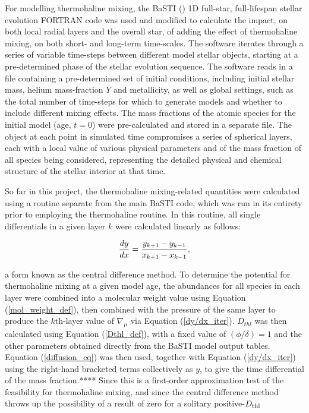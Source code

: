\documentclass[usenatbib]{mnras}
\begin{document}
For modelling thermohaline mixing, the BaSTI (\citet{2004ApJ...612..168P}) 1D full-star, full-lifespan stellar evolution FORTRAN code was used and modified to calculate the impact, on both local radial layers and the overall star, of adding the effect of thermohaline mixing, on both short- and long-term time-scales. The software iterates through a series of variable time-steps between different model stellar objects, starting at a pre-determined phase of the stellar evolution sequence. The software reads in a file containing a pre-determined set of initial conditions, including initial stellar mass, helium mass-fraction $Y$ and metallicity, as well as global settings, such as the total number of time-steps for which to generate models and whether to include different mixing effects. The mass fractions of the atomic species for the initial model (age, $t = 0$) were pre-calculated and stored in a separate file.
The object at each point in simulated time compromises a series of spherical layers, each with a local value of various physical parameters and of the mass fraction of all species being considered, representing the detailed physical and chemical structure of the stellar interior at that time.

So far in this project, the thermohaline mixing-related quantities were calculated using a routine separate from the main BaSTI code, which was run in its entirety prior to employing the thermohaline routine. In this routine, all single differentials in a given layer $k$ were calculated linearly as follows:

\begin{equation}
\frac{dy}{dx} = \frac{y_{k+1} - y_{k-1}}{x_{k+1} - x_{k-1}} \textnormal{,}
\label{dy/dx_iter}
\end{equation}

a form known as the central difference method.
To determine the potential for thermohaline mixing at a given model age, the abundances for all species in each layer were combined into a molecular weight value using Equation (\ref{mol_weight_def}), then combined with the pressure of the same layer to produce the $k$th-layer value of $\nabla_{\mu}$ via Equation (\ref{dy/dx_iter}). $D_{thl}$ was then calculated using Equation (\ref{Dthl_def}), with a fixed value of $(\phi/\delta) = 1$ and the other parameters obtained directly from the BaSTI model output tables. Equation (\ref{diffusion_eq}) was then used, together with Equation (\ref{dy/dx_iter}) using the right-hand bracketed terms collectively as $y$, to give the time differential of the mass fraction.**** Since this is a first-order approximation test of the feasibility for thermohaline mixing, and since the central difference method throws up the possibility of a result of zero for a solitary positive-$D_{\textnormal{thl}}$
\end{document}
